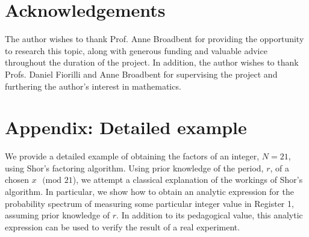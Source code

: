 \documentclass{article}
\begin{document}
\section*{Acknowledgements}
The author wishes to thank Prof. Anne Broadbent for providing the opportunity to research this topic, along with generous funding and valuable advice throughout the duration of the project. In addition, the author wishes to thank Profs. Daniel Fiorilli and Anne Broadbent for supervising the project and furthering the author's interest in mathematics.







  

\pagebreak

\appendix
\section{Appendix: Detailed example}
We provide a detailed example of obtaining the factors of an integer, $N = 21$, using Shor's factoring algorithm. Using prior knowledge of the period, $r$, of a chosen $x \text{ }(\text{mod } 21$), we attempt a classical explanation of the workings of Shor's algorithm. In particular, we show how to obtain an analytic expression for the probability spectrum of measuring some particular integer value in Register 1, assuming prior knowledge of $r$. In addition to its pedagogical value, this analytic expression can be used to verify the result of a real experiment.
\end{document}
